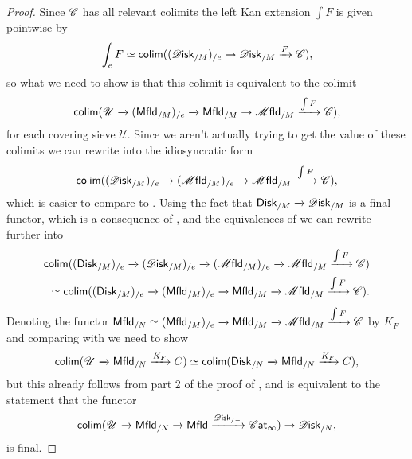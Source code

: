 \documentclass[../text]{subfiles}
\begin{document}
\begin{proof}
    Since $\mathscr{C}$ has all relevant colimits the left Kan extension $\int F$ is given pointwise by
    \begin{equation}\label{eq:pointwiseKan}
        \int_e F \simeq \mathsf{colim} ((\disk_{/M})_{/e} \xrightarrow{} \disk_{/M} \xrightarrow{F} \catC),
    \end{equation}
    so what we need to show is that this colimit is equivalent to the colimit
    \begin{equation}\label{eq:cosheaf_colim_relative}
        \mathsf{colim} (\mathscr{U} \xrightarrow{} (\mfld[r]_{/M})_{/e} \xrightarrow{} \mfld[r]_{/M} \rightarrow \mfld_{/M} \xrightarrow{\int F} \catC),
    \end{equation}
    for each covering sieve $\mathscr{U}$. Since we aren't actually trying to get the value of these colimits we can rewrite  into the idiosyncratic form
    \begin{equation}\label{eq:idiosync_form}
        \mathsf{colim} ((\disk_{/M})_{/e} \xrightarrow{} (\mfld_{/M})_{/e} \xrightarrow{} \mfld_{/M} \xrightarrow{\int F} \catC),
    \end{equation}
    which is easier to compare to . Using the fact that $\disk[r]_{/M} \xrightarrow{} \disk_{/M}$ is a final functor, which is a consequence of \cite[prop.2.22]{aft_fhstrat}, and the equivalences of  we can rewrite  further into
    \begin{align}
        \mathsf{colim} ((\disk[r]_{/M})_{/e} \xrightarrow{} (\disk_{/M})_{/e} \xrightarrow{} (\mfld_{/M})_{/e} \xrightarrow{} \mfld_{/M} \xrightarrow{\int F} \catC) \\ \simeq \mathsf{colim} ((\disk[r]_{/M})_{/e} \xrightarrow{} (\mfld[r]_{/M})_{/e} \xrightarrow{} \mfld[r]_{/M} \xrightarrow{} \mfld_{/M} \xrightarrow{\int F} \catC).
    \end{align}
    Denoting the functor $\mfld[r]_{/N} \simeq (\mfld[r]_{/M})_{/e} \xrightarrow{} \mfld[r]_{/M} \xrightarrow{} \mfld_{/M} \xrightarrow{\int F} \catC$ by $K_F$ and comparing with  we need to show
    \begin{equation}
        \mathsf{colim} (\mathscr{U} \xrightarrow{} \mfld[r]_{/N} \xrightarrow{K_F} C) \simeq \mathsf{colim} (\disk[r]_{/N} \xrightarrow{} \mfld[r]_{/N} \xrightarrow{K_F} C),
    \end{equation}
    but this already follows from part 2 of the proof of \cite[prop.2.22]{af_primer}, and is equivalent to the statement that the functor
    \begin{equation}
        \mathsf{colim} (\mathscr{U} \xrightarrow{} \mfld[r]_{/N} \xrightarrow{} \mfld[r] \xrightarrow{\disk_{/-}} \cat) \xrightarrow{} \disk_{/N},
    \end{equation}
    is final.
\end{proof}
\end{document}

